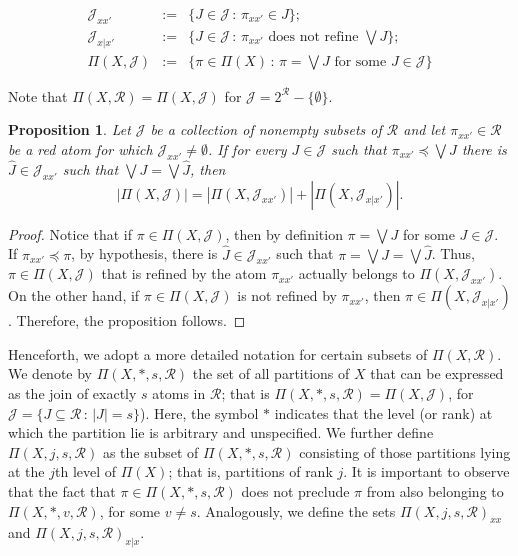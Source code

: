 \documentclass[12pt]{extarticle}
\newtheorem{Proposition}{Proposition}
\begin{document}
	\begin{eqnarray*}
		\mathcal{J}_{xx'}&:=&\{J \in\mathcal{J}\,:\, \pi_{xx'}\in J\};\\
		\mathcal{J}_{x|x'} &:=&\{J\in\mathcal{J}\,:\, \pi_{xx'}\text{ does not refine }\bigvee J\};\\
		\Pi(X,\mathcal{J})&:=&\{\pi\in\Pi(X)\,:\, \pi=\bigvee J \text{ for some } J\in\mathcal{J}\}
	\end{eqnarray*}
	
Note that $\Pi(X,\mathcal{R})= \Pi(X,\mathcal{J})$ for $\mathcal{J}= 2^{\mathcal{R}}-\{\emptyset\}$.
	
	\begin{Proposition}\label{RecursiveFormulaAtoms} 	
		Let	$\mathcal{J}$ be a collection of nonempty subsets of $\mathcal{R}$ and let $\pi_{xx'}\in \mathcal{R}$ be a red atom for which $\mathcal{J}_{xx'}\neq\emptyset$. If for every $J\in\mathcal{J}$ such that $\pi_{xx'}\preceq\bigvee J$ there is $\hat{J}\in\mathcal{J}_{xx'}$ such that $\bigvee J=\bigvee\hat{J}$, then
		\begin{equation}
		|\Pi(X,\mathcal{J})| = 	|\Pi(X,\mathcal{J}_{xx'})|+ 	|\Pi(X,\mathcal{J}_{x|x'})|.
		\end{equation}	
	\end{Proposition}
	\begin{proof} Notice that if $\pi\in \Pi(X,\mathcal{J})$, then by definition  $\pi=\bigvee J$ for some $J\in\mathcal{J}$. If $\pi_{xx'}\preceq\pi$, by hypothesis, there is $\hat{J}\in\mathcal{J}_{xx'}$ such that $\pi=\bigvee J =\bigvee \hat{J}$. Thus, $\pi\in \Pi(X,\mathcal{J})$ that is refined by the atom $\pi_{xx'}$ actually belongs to $\Pi(X,\mathcal{J}_{xx'})$. On the other hand, if $\pi\in \Pi(X,\mathcal{J})$ is not refined by $\pi_{xx'}$, then $\pi\in\Pi(X,\mathcal{J}_{x|x'})$. Therefore, the proposition follows.
	\end{proof}

	Henceforth, we adopt a more detailed notation for certain subsets of $\Pi(X,\mathcal{R})$. We denote by $\Pi(X,\ast, s, \mathcal{R})$ the set of all partitions of $X$ that can be expressed as the join of exactly $s$ atoms in $\mathcal{R}$; that is  $\Pi(X,\ast, s, \mathcal{R})=\Pi(X,\mathcal{J})$, for $\mathcal{J}=\{J\subseteq \mathcal{R}\,:\, |J|=s\}$). Here, the symbol $\ast$ indicates that the level (or rank) at which the partition lie is arbitrary and unspecified. We further define $\Pi(X,j, s, \mathcal{R})$  as the subset of $\Pi(X,\ast, s, \mathcal{R})$ consisting of those partitions lying at the $j$th level of $\Pi(X)$; that is, partitions of rank $j$. 
	It is important to observe that the fact that $\pi\in\Pi(X,\ast, s, \mathcal{R})$ does not preclude $\pi$ from also belonging to $\Pi(X,\ast, v, \mathcal{R})$, for some $v\neq s$.  Analogously, we define the sets $\Pi(X, j, s, \mathcal{R})_{xx}$ and $\Pi(X, j, s,\mathcal{R})_{x|x}$. 
	
\end{document}
